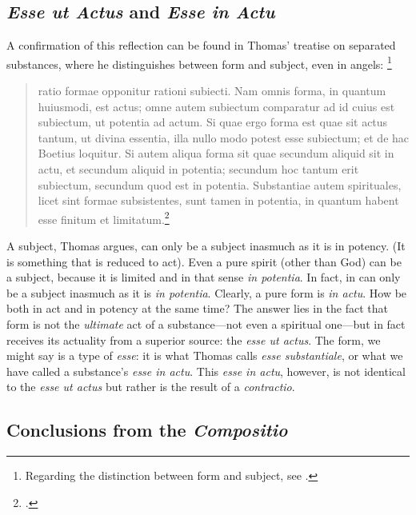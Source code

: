 \subsection{\emph{Esse ut Actus} and \emph{Esse in Actu}}
A confirmation of this reflection can be found in Thomas’ treatise on separated substances, where he distinguishes between form and subject, even in angels:%
%
\footnote{Regarding the distinction between form and subject, see \cite[54]{contat:esse-essentia-ordo}.}
%
\begin{quotation}
ratio formae opponitur rationi subiecti. Nam omnis forma, in quantum huiusmodi, est actus; omne autem subiectum comparatur ad id cuius est subiectum, ut potentia ad actum. Si quae ergo forma est quae sit actus tantum, ut divina essentia, illa nullo modo potest esse subiectum; et de hac Boetius loquitur. Si autem aliqua forma sit quae secundum aliquid sit in actu, et secundum aliquid in potentia; secundum hoc tantum erit subiectum, secundum quod est in potentia. Substantiae autem spirituales, licet sint formae subsistentes, sunt tamen in potentia, in quantum habent esse finitum et limitatum.\footcite[a.~1, ad~1]{st:spiritualibus}
\end{quotation}
%
A subject, Thomas argues, can only be a subject inasmuch as it is in potency. (It is something that is reduced to act). Even a pure spirit (other than God) can be a subject, because it is limited and in that sense \emph{in potentia}. In fact, in can only be a subject inasmuch as it is \emph{in potentia}. Clearly, a pure form is \emph{in actu}. How be both in act and in potency at the same time? The answer lies in the fact that form is not the \emph{ultimate} act of a substance—not even a spiritual one—but in fact receives its actuality from a superior source: the \emph{esse ut actus}. The form, we might say is a type of \emph{esse}: it is what Thomas calls \emph{esse substantiale}, or what we have called a substance’s \emph{esse in actu}. This \emph{esse in actu}, however, is not identical to the \emph{esse ut actus} but rather is the result of a \emph{contractio}.

\subsection{Conclusions from the \emph{Compositio}}

